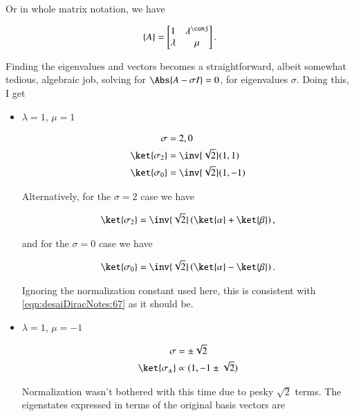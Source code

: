 Or in whole matrix notation, we have

\begin{align}\label{eqn:desaiDiracNotes:71}
\{ A \} = 
\begin{bmatrix}
1 & \lambda^\conj \\
\lambda & \mu
\end{bmatrix}.
\end{align}

Finding the eigenvalues and vectors becomes a straightforward, albeit somewhat tedious, algebraic job, solving for $\Abs{ A - \sigma I } = 0$, for eigenvalues $\sigma$.  Doing this, I get

\begin{itemize}
\item $\lambda = 1$, $\mu = 1$

\begin{align}\label{eqn:desaiDiracNotes:72}
\sigma &= 2,0 \\
\ket{\sigma_2} &= \inv{\sqrt{2}} (1,1) \\
\ket{\sigma_0} &= \inv{\sqrt{2}} (1,-1) 
\end{align}

Alternatively, for the $\sigma=2$ case we have

\begin{align}\label{eqn:desaiDiracNotes:72i}
\ket{\sigma_2} = \inv{\sqrt{2}}\left( \ket{\alpha} + \ket{\beta} \right),
\end{align}

and for the $\sigma=0$ case we have

\begin{align}\label{eqn:desaiDiracNotes:72ii}
\ket{\sigma_0} = \inv{\sqrt{2}}\left( \ket{\alpha} - \ket{\beta} \right).
\end{align}

Ignoring the normalization constant used here, this is consistent with \ref{eqn:desaiDiracNotes:67} as it should be.

\item $\lambda = 1$, $\mu = -1$

\begin{align}\label{eqn:desaiDiracNotes:73}
\sigma &= \pm \sqrt{2} \\
\ket{\sigma_{\pm}} &\propto (1,-1 \pm \sqrt{2}) 
\end{align}

Normalization wasn't bothered with this time due to pesky $\sqrt{2}$ terms.  The eigenstates expressed in terms of the original basis vectors are 


\end{itemize}
